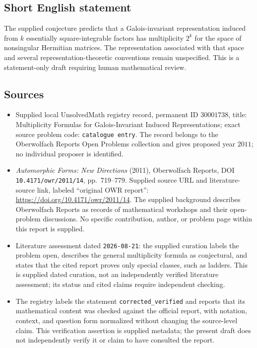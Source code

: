 \documentclass[11pt]{article}
\begin{document}
\subsection{Short English statement}
The supplied conjecture predicts that a Galois-invariant representation induced from \(k\) essentially square-integrable factors has multiplicity \(2^k\) for the space of nonsingular Hermitian matrices. The representation associated with that space and several representation-theoretic conventions remain unspecified. This is a statement-only draft requiring human mathematical review.
\subsection{Sources}
\begin{itemize}
\item Supplied local UnsolvedMath registry record, permanent ID \(30001738\), title: Multiplicity Formulas for Galois-Invariant Induced Representations; exact source problem code: \texttt{catalogue entry}. The record belongs to the Oberwolfach Reports Open Problems collection and gives proposed year \(2011\); no individual proposer is identified.
\item \emph{Automorphic Forms: New Directions} (2011), Oberwolfach Reports, DOI \texttt{10.4171/owr/2011/14}, pp.\ 719--779. Supplied source URL and literature-source link, labeled ``original OWR report'': \url{https://doi.org/10.4171/owr/2011/14}. The supplied background describes Oberwolfach Reports as records of mathematical workshops and their open-problem discussions. No specific contribution, author, or problem page within this report is supplied.
\item Literature assessment dated \texttt{2026-08-21}: the supplied curation labels the problem open, describes the general multiplicity formula as conjectural, and states that the cited report proves only special classes, such as ladders. This is supplied dated curation, not an independently verified literature assessment; its status and cited claims require independent checking.
\item The registry labels the statement \texttt{corrected\_verified} and reports that its mathematical content was checked against the official report, with notation, context, and question form normalized without changing the source-level claim. This verification assertion is supplied metadata; the present draft does not independently verify it or claim to have consulted the report.
\end{itemize}
\end{document}
